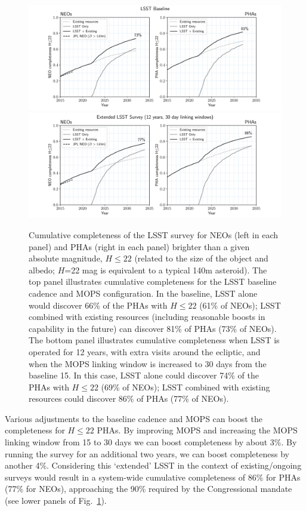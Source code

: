 \begin{figure}
\includegraphics[width=1.\hsize,clip]{neo_pha_completeness_3in15_minion_1016}
\includegraphics[width=1.\hsize,clip]{neo_pha_completeness_3in30_astro_lsst_01_1016}
\caption{Cumulative completeness of the LSST survey for NEOs (left in each panel) and PHAs (right in each panel)
brighter than a given absolute magnitude, $H\le22$ (related to the size of the object and albedo;
$H$=22 mag is equivalent to a typical 140m asteroid). The top panel illustrates cumulative completeness
for the LSST baseline cadence and MOPS configuration. In the baseline, LSST alone would discover 66\% of the PHAs
with $H\le22$ (61\% of NEOs); LSST combined with existing resources (including reasonable boosts
in capability in the future) can discover 81\% of PHAs (73\% of NEOs). The bottom panel illustrates cumulative
completeness when LSST is operated for 12 years, with extra visits around the ecliptic, and when the MOPS linking
window is increased to 30 days from the baseline 15. In this case, LSST alone could discover 74\% of the PHAs with
$H\le22$ (69\% of NEOs); LSST combined with existing resources could discover 86\% of PHAs (77\% of NEOs).
}
\label{Fig:Cneo}
\end{figure}

Various adjustments to the baseline cadence and MOPS can boost the completeness for $H\le22$ PHAs.
By improving MOPS and increasing the MOPS linking window from 15 to 30 days we can boost completeness
by about 3\%. By running the survey for an additional two years, we can boost completeness by another 4\%.
Considering this `extended' LSST in the context of existing/ongoing surveys would result in a system-wide cumulative completeness of 86\% for PHAs (77\% for NEOs), approaching the 90\% required by the Congressional mandate (see
lower panels of Fig.~\ref{Fig:Cneo}).

